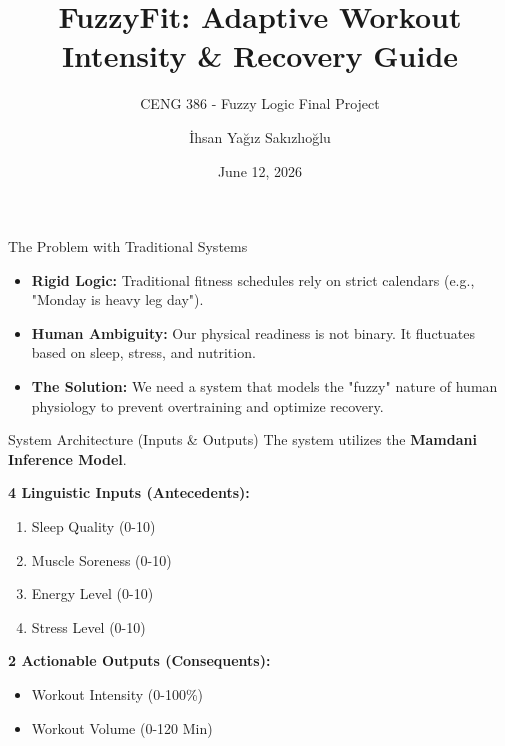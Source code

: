 \documentclass[11pt]{beamer}
\title[FuzzyFit Assistant]{FuzzyFit: Adaptive Workout Intensity \& Recovery Guide}
\subtitle{CENG 386 - Fuzzy Logic Final Project}
\author[İ. Y. Sakızlıoğlu]{İhsan Yağız Sakızlıoğlu}
\institute[IYTE]{
  Department of Computer Engineering \\
  İzmir Institute of Technology \\
  Student ID: 300201071
}
\date{June 12, 2026}
\begin{document}
\begin{frame}
  \titlepage
\end{frame}

\begin{frame}{The Problem with Traditional Systems}
  \begin{itemize}
    \item \textbf{Rigid Logic:} Traditional fitness schedules rely on strict calendars (e.g., "Monday is heavy leg day").
    \item \textbf{Human Ambiguity:} Our physical readiness is not binary. It fluctuates based on sleep, stress, and nutrition.
    \item \textbf{The Solution:} We need a system that models the "fuzzy" nature of human physiology to prevent overtraining and optimize recovery.
  \end{itemize}
\end{frame}

\begin{frame}{System Architecture (Inputs \& Outputs)}
  The system utilizes the \textbf{Mamdani Inference Model}.
  
  \vspace{0.5cm}
  \textbf{4 Linguistic Inputs (Antecedents):}
  \begin{enumerate}
      \item Sleep Quality (0-10)
      \item Muscle Soreness (0-10)
      \item Energy Level (0-10)
      \item Stress Level (0-10)
  \end{enumerate}
  
  \vspace{0.3cm}
  \textbf{2 Actionable Outputs (Consequents):}
  \begin{itemize}
      \item Workout Intensity (0-100\%)
      \item Workout Volume (0-120 Min)
  \end{itemize}
\end{frame}
\end{document}

